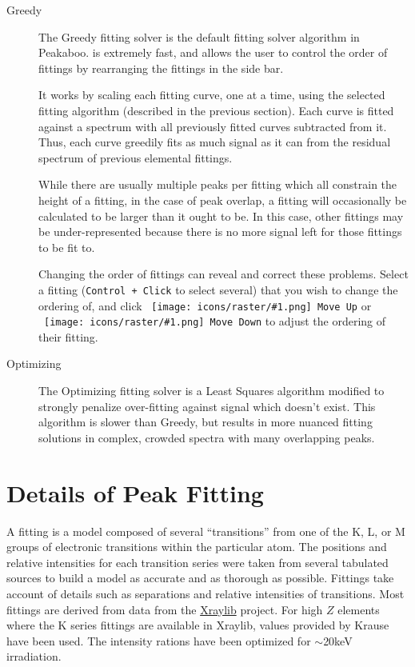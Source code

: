 \documentclass[article,twoside,11pt]{report}
\newcommand{\command}[1]{\texttt{#1}}
\newcommand{\icon}[1]{\texttt{[image: icons/raster/\#1.png]}}
\newcommand{\button}[2]{\ \command{\icon{#1} #2}}
\newcommand{\shortcut}[2]{\command{#1 + #2}}
\newcommand{\tocsection}[1]{\section*{#1}\addcontentsline{toc}{section}{#1}}
\begin{document}
\begin{description}

\item [Greedy] The Greedy fitting solver is the default fitting solver algorithm in Peakaboo. is extremely fast, and allows the user to control the order of fittings by rearranging the fittings in the side bar. 

It works by scaling each fitting curve, one at a time, using the selected fitting algorithm (described in the previous section). Each curve is fitted against a spectrum with all previously fitted curves subtracted from it. Thus, each curve greedily fits as much signal as it can from the residual spectrum of previous elemental fittings.

While there are usually multiple peaks per fitting which all constrain the height of a fitting, in the case of peak overlap, a fitting will occasionally be calculated to be larger than it ought to be. In this case, other fittings may be under-represented because there is no more signal left for those fittings to be fit to.

Changing the order of fittings can reveal and correct these problems. Select a fitting (\shortcut{Control}{Click} to select several) that you wish to change the ordering of, and click \button{go-up}{Move Up} or \button{go-down}{Move Down} to adjust the ordering of their fitting.


\item [Optimizing] The Optimizing fitting solver is a Least Squares algorithm modified to strongly penalize over-fitting against signal which doesn't exist. This algorithm is slower than Greedy, but results in more nuanced fitting solutions in complex, crowded spectra with many overlapping peaks.

\end{description}


\tocsection{Details of Peak Fitting}

A fitting is a model composed of several ``transitions'' from one of the K, L, or M groups of electronic transitions within the particular atom. The positions and relative intensities for each transition series were taken from several tabulated sources to build a model as accurate and as thorough as possible. Fittings take account of details such as separations and relative intensities of transitions. Most fittings are derived from data from the \href{https://github.com/tschoonj/xraylib}{Xraylib} \cite{xraylib} project. For high $Z$ elements where the K series fittings are available in Xraylib, values provided by Krause 
\cite{krause} have been used. The intensity rations have been optimized for $\sim$20keV irradiation.
\end{document}
